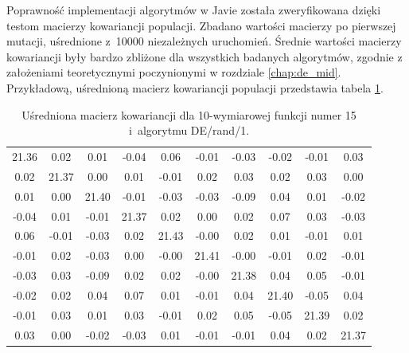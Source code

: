 \documentclass[a4paper,onecolumn,oneside,12pt,wide,floatssmall]{mwrep}
\theoremstyle{definition}
\theoremstyle{plain}%
\theoremstyle{remark}
\begin{document}
Poprawność implementacji algorytmów w Javie została zweryfikowana dzięki testom macierzy kowariancji
populacji. Zbadano wartości macierzy po pierwszej mutacji, uśrednione z~10000 niezależnych uruchomień. 
Średnie wartości macierzy kowariancji były bardzo zbliżone dla wszystkich badanych algorytmów, 
zgodnie z założeniami teoretycznymi poczynionymi w rozdziale
\ref{chap:de_mid}. Przykładową, uśrednioną macierz kowariancji populacji przedstawia tabela 
\ref{table:cov_matrix}. 

\begin{table}[H]
\centering
\begin{tabular}{ c c c c c c c c c c }
21.36 & 0.02 & 0.01 & -0.04 & 0.06 & -0.01 & -0.03 & -0.02 & -0.01 & 0.03 \\
0.02 & 21.37 & 0.00 & 0.01 & -0.01 & 0.02 & 0.03 & 0.02 & 0.03 & 0.00 \\
0.01 & 0.00 & 21.40 & -0.01 & -0.03 & -0.03 & -0.09 & 0.04 & 0.01 & -0.02 \\
-0.04 & 0.01 & -0.01 & 21.37 & 0.02 & 0.00 & 0.02 & 0.07 & 0.03 & -0.03 \\
0.06 & -0.01 & -0.03 & 0.02 & 21.43 & -0.00 & 0.02 & 0.01 & -0.01 & 0.01 \\
-0.01 & 0.02 & -0.03 & 0.00 & -0.00 & 21.41 & -0.00 & -0.01 & 0.02 & -0.01 \\
-0.03 & 0.03 & -0.09 & 0.02 & 0.02 & -0.00 & 21.38 & 0.04 & 0.05 & -0.01 \\
-0.02 & 0.02 & 0.04 & 0.07 & 0.01 & -0.01 & 0.04 & 21.40 & -0.05 & 0.04 \\
-0.01 & 0.03 & 0.01 & 0.03 & -0.01 &  0.02 & 0.05 & -0.05 & 21.39 & 0.02 \\
0.03 & 0.00 & -0.02 & -0.03 & 0.01 & -0.01 & -0.01 &  0.04 & 0.02 & 21.37 \\
\end{tabular}
\caption{Uśredniona macierz kowariancji dla 10-wymiarowej funkcji numer 15 i~algorytmu DE/rand/1.}
\label{table:cov_matrix}
\end{table}
\end{document}

